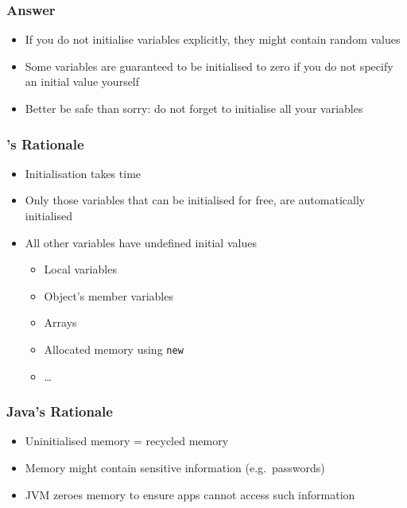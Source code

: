 \begin{frame}
  \frametitle{Answer}
  \begin{itemize}
    \item If you do not initialise variables explicitly, they might contain random values
    \item Some variables are guaranteed to be initialised to zero if you do not specify an initial value yourself
    \item Better be safe than sorry: do not forget to initialise all your variables
  \end{itemize}
\end{frame}

\begin{frame}
  \frametitle{\cpp's Rationale}
  \begin{itemize}
    \item Initialisation takes time
    \item Only those variables that can be initialised for free, are automatically initialised
    \item All other variables have undefined initial values
          \begin{itemize}
            \item Local variables
            \item Object's member variables
            \item Arrays
            \item Allocated memory using {\tt new}
            \item \dots
          \end{itemize}
  \end{itemize}
\end{frame}

\begin{frame}
  \frametitle{Java's Rationale}
  \begin{itemize}
    \item Uninitialised memory = recycled memory
    \item Memory might contain sensitive information (e.g.\ passwords)
    \item JVM zeroes memory to ensure apps cannot access such information
  \end{itemize}
\end{frame}

